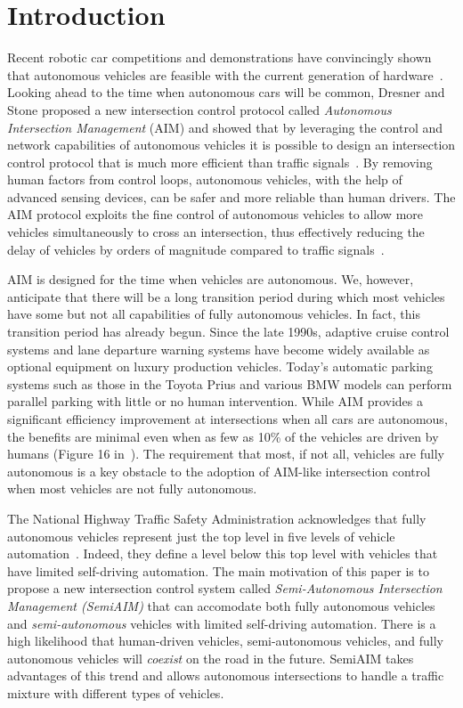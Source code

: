 \section{Introduction}
\label{sec:introduction}

Recent robotic car competitions and demonstrations have convincingly
shown that autonomous vehicles are feasible with the current
generation of hardware~\cite{mybib:Darpa07Urban}. Looking ahead to the
time when autonomous cars will be common, Dresner and Stone proposed a
new intersection control protocol called \emph{Autonomous Intersection
Management} (AIM) and showed that by leveraging the control and
network capabilities of autonomous vehicles it is possible to design
an intersection control protocol that is much more efficient than
traffic signals~\cite{bib:Dresner08Multiagent}.  By removing human
factors from control loops, autonomous vehicles, with the help of
advanced sensing devices, can be safer and more reliable than human
drivers.  The AIM protocol exploits the fine control of autonomous
vehicles to allow more vehicles simultaneously to cross an
intersection, thus effectively reducing the delay of vehicles by
orders of magnitude compared to traffic
signals~\cite{bib:Fajardo12Automated}.

AIM is designed for the time when vehicles are autonomous.  We,
however, anticipate that there will be a long transition period during
which most vehicles have some but not all capabilities of fully
autonomous vehicles.  In fact, this transition period has already
begun. Since the late 1990s, adaptive cruise control systems and lane
departure warning systems have become widely available as optional
equipment on luxury production vehicles.  Today's automatic parking
systems such as those in the Toyota Prius and various BMW models can
perform parallel parking with little or no human intervention.  While
AIM provides a significant efficiency improvement at intersections
when all cars are autonomous, the benefits are minimal even when as
few as 10\% of the vehicles are driven by humans (Figure 16
in~\cite{bib:Dresner08Multiagent}).  The requirement that most, if not
all, vehicles are fully autonomous is a key obstacle to the adoption
of AIM-like intersection control when most vehicles are not fully
autonomous.

The National Highway Traffic Safety Administration acknowledges that
fully autonomous vehicles represent just the top level in five levels
of vehicle automation~\cite{bib:NHTSA13Preliminary}. Indeed, they
define a level below this top level with vehicles that
have limited self-driving automation.
The main motivation of this paper is to
propose a new intersection control system called
\emph{Semi-Autonomous Intersection Management (SemiAIM)} that can
accomodate both fully autonomous vehicles and
\emph{semi-autonomous} vehicles with limited self-driving automation.
There is a high likelihood that
human-driven vehicles, semi-autonomous vehicles, and fully autonomous
vehicles will \emph{coexist} on the road in the future.  SemiAIM takes
advantages of this trend and allows autonomous intersections to handle
a traffic mixture with different types of vehicles.

